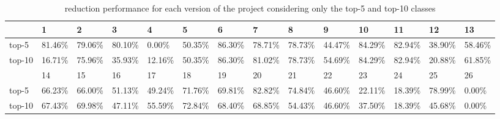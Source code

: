 \documentclass{article}
\begin{document}
\begin{table}[h]
	\setlength{\tabcolsep}{3pt}
	\begin{tabular}{llllllllllllll}
		\toprule
		   & 1       & 2       & 3       & 4       & 5       & 6       & 7       & 8       & 9       & 10      & 11      & 12      & 13      \\\midrule
	top-5  & 81.46\% & 79.06\% & 80.10\% & 0.00\%  & 50.35\% & 86.30\% & 78.71\% & 78.73\% & 44.47\% & 84.29\% & 82.94\% & 38.90\% & 58.46\% \\
	top-10 & 16.71\% & 75.96\% & 35.93\% & 12.16\% & 50.35\% & 86.30\% & 81.02\% & 78.73\% & 54.69\% & 84.29\% & 82.94\% & 20.88\% & 61.85\% \\\midrule
		   & 14      & 15      & 16      & 17      & 18      & 19      & 20      & 21      & 22      & 23      & 24      & 25      & 26      \\\midrule
	top-5  & 66.23\% & 66.00\% & 51.13\% & 49.24\% & 71.76\% & 69.81\% & 82.82\% & 74.84\% & 46.60\% & 22.11\% & 18.39\% & 78.99\% & 0.00\%  \\
	top-10 & 67.43\% & 69.98\% & 47.11\% & 55.59\% & 72.84\% & 68.40\% & 68.85\% & 54.43\% & 46.60\% & 37.50\% & 18.39\% & 45.68\% & 0.00\%  \\
		\bottomrule
	\end{tabular}
	\caption {\ds{} reduction performance for each version of the \chart{} project considering only the top-5 and top-10 classes}
	\label{table:reduction}
\end{table}
\end{document}
